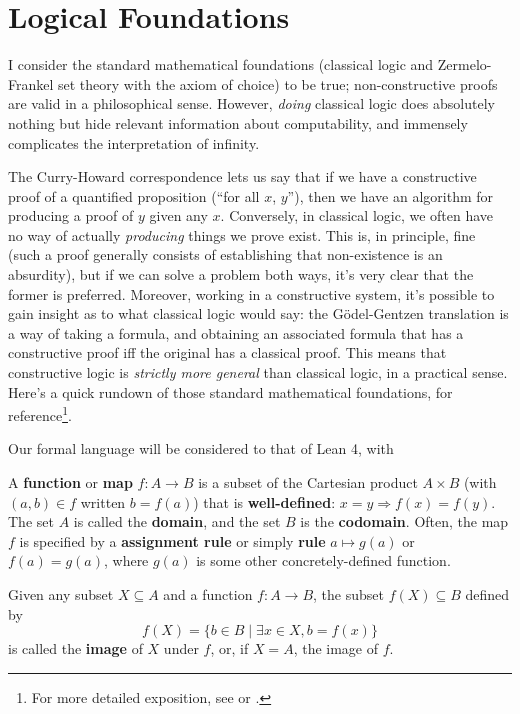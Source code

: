 \chapter{Logical Foundations}
I consider the standard mathematical foundations (classical logic and Zermelo-Frankel set theory with the axiom of choice) to be true;
non-constructive proofs are valid in a philosophical sense.
However, \textit{doing} classical logic does absolutely nothing but hide relevant information about computability,
and immensely complicates the interpretation of infinity.

The Curry-Howard correspondence lets us say that if we have a constructive proof of a quantified proposition (``for all $x$, $y$''),
then we have an algorithm for producing a proof of $y$ given any $x$.
Conversely, in classical logic, we often have no way of actually \textit{producing} things we prove exist.
This is, in principle, fine (such a proof generally consists of establishing that non-existence is an absurdity),
but if we can solve a problem both ways, it's very clear that the former is preferred.
Moreover, working in a constructive system, it's possible to gain insight as to what classical logic would say:
the G\"odel-Gentzen translation is a way of taking a formula, and obtaining an associated formula that has a constructive proof
iff the original has a classical proof.
This means that constructive logic is \textit{strictly more general} than classical logic, in a practical sense.
Here's a quick rundown of those standard mathematical foundations, for reference\footnote
{
For more detailed exposition, see \cite{Enderton} or \cite{Forall}.

}.

Our formal language will be considered to that of Lean 4, with

\begin{definition}
  A \textbf{function} or \textbf{map} $f: A \to B$ is a subset of the Cartesian product $A \times B$ (with $(a, b) \in f$ written $b = f(a)$)
  that is \textbf{well-defined}: $x = y \Rightarrow f(x) = f(y)$.
  The set $A$ is called the \textbf{domain}, and the set $B$ is the \textbf{codomain}.
  Often, the map $f$ is specified by a \textbf{assignment rule} or simply \textbf{rule} $a \mapsto g(a)$ or $f(a) = g(a)$,
  where $g(a)$ is some other concretely-defined function.
\end{definition}

\begin{definition}
  Given any subset $X \subseteq A$ and a function $f: A \to B$, the subset $f(X) \subseteq B$ defined by
  \[
    f(X) = \{b \in B \mid \exists x \in X, b = f(x)\}
  \]
  is called the \textbf{image} of $X$ under $f$, or, if $X = A$, the image of $f$.
\end{definition}

